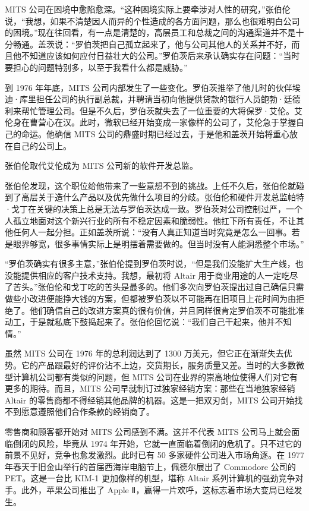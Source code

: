\documentclass[12pt,UTF8]{ctexbook}
\begin{document}
MITS 公司在困境中愈陷愈深。“这种困境实际上要牵涉对人性的研究，”张伯伦说，“我想，如果不清楚因人而异的个性造成的各方面问题，那么也很难明白公司的困境。”现在往回看，有一点是清楚的，高层员工和总裁之间的沟通渠道并不是十分畅通。盖茨说：“罗伯茨把自己孤立起来了，他与公司其他人的关系并不好，而且他不知道应该如何应付日益壮大的公司。”罗伯茨后来承认确实存在问题：“当时要担心的问题特别多，以至于我看什么都是威胁。”

到 1976 年年底，MITS 公司内部发生了一些变化。罗伯茨推举了他儿时的伙伴埃迪·库里担任公司的执行副总裁，并聘请当初向他提供贷款的银行人员鲍勃·廷德利来帮忙管理公司。但是不久后，罗伯茨就失去了一位重要的大将保罗·艾伦。艾伦身在曹营心在汉。此时，微软已经开始变成一家像样的公司了，艾伦急于掌握自己的命运。他确信 MITS 公司的鼎盛时期已经过去，于是他和盖茨开始将重心放在自己的公司上。

张伯伦取代艾伦成为 MITS 公司新的软件开发总监。

张伯伦发现，这个职位给他带来了一些意想不到的挑战。上任不久后，张伯伦就碰到了高层关于造什么产品以及优先做什么项目的分歧。张伯伦和硬件开发总监帕特·戈丁在关键的决策上总是无法与罗伯茨达成一致。罗伯茨对公司控制过严，一个人孤立地面对这个新兴行业的所有不稳定因素和脆弱性。他扛下所有责任，不让其他任何人一起分担。正如盖茨所说：“没有人真正知道当时究竟是怎么一回事。若是眼界够宽，很多事情实际上是明摆着需要做的。但当时没有人能洞悉整个市场。”

“罗伯茨确实有很多主意，”张伯伦提到罗伯茨时说，“但是我们没能扩大生产线，也没能提供相应的客户技术支持。我想，最初将 Altair 用于商业用途的人一定吃尽了苦头。”张伯伦和戈丁吃的苦头是最多的。他们多次向罗伯茨提出过自己确信只需做些小改进便能挣大钱的方案，但都被罗伯茨以不可能再在旧项目上花时间为由拒绝了。他们确信自己的改进方案真的很有价值，并且同样很肯定罗伯茨不可能批准动工，于是就私底下鼓捣起来了。张伯伦回忆说：“我们自己干起来，他并不知情。”

虽然 MITS 公司在 1976 年的总利润达到了 1300 万美元，但它正在渐渐失去优势。它的产品跟最好的评价沾不上边，交货期长，服务质量又差。当时的大多数微型计算机公司都有类似的问题，但 MITS 公司在业界的崇高地位使得人们对它有更多的期待。而且，MITS 公司早就制订过独家经销方案：那些在当地独家经销 Altair 的零售商都不得经销其他品牌的机器。这是一把双刃剑，MITS 公司开始找不到愿意遵照他们合作条款的经销商了。

零售商和顾客都开始对 MITS 公司感到不满。这并不代表 MITS 公司马上就会面临倒闭的风险，毕竟从 1974 年开始，它就一直面临着倒闭的危机了。只不过它的前景不见好，竞争也愈发激烈。此时已有 50 多家硬件公司进入市场角逐。在 1977 年春天于旧金山举行的首届西海岸电脑节上，佩德尔展出了 Commodore 公司的 PET。这是一台比 KIM-1 更加像样的机型，堪称 Altair 系列计算机的强劲竞争对手。此外，苹果公司推出了 Apple Ⅱ，赢得一片欢呼，这标志着市场大变局已经发生。
\end{document}
